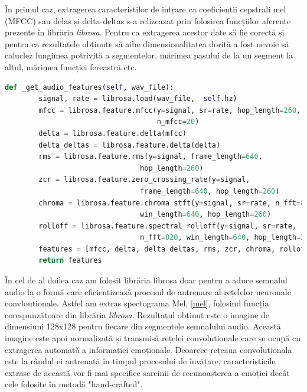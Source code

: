 \documentclass[a4paper,12pt]{book}
\begin{document}
				În primul caz, extragerea caracteristilor de intrare ca coeficientii cepstrali mel (MFCC) sau delas și delta-deltas s-a relizeazat prin folosirea funcțiilor aferente prezente în librăria \textit{librosa}. Pentru ca extragerea acestor date să fie corectă și pentru ca rezultatele obținute să aibe dimensionalitatea dorită a fost nevoie să caluclez lungimea potrivită a segmentelor, mărimea pasului de la un segment la altul, mărimea funcției fereastră etc. \par
				
				\begin{lstlisting}[language=Python, caption={Extragerea caracteristicilor hand-crafted, 3.3, folosind libraria librosa.}, xleftmargin=0cm]
 def _get_audio_features(self, wav_file):
		signal, rate = librosa.load(wav_file,  self.hz)
		mfcc = librosa.feature.mfcc(y=signal, sr=rate, hop_length=260, 
									n_mfcc=20)
		delta = librosa.feature.delta(mfcc)
		delta_deltas = librosa.feature.delta(delta)
		rms = librosa.feature.rms(y=signal, frame_length=640, 
								hop_length=260)
		zcr = librosa.feature.zero_crossing_rate(y=signal, 
								frame_length=640, hop_length=260)
		chroma = librosa.feature.chroma_stft(y=signal, sr=rate, n_fft=820, 
								win_length=640,	hop_length=260)
		rolloff = librosa.feature.spectral_rolloff(y=signal, sr=rate, 
								n_fft=820, win_length=640, hop_length=260)
		features = [mfcc, delta, delta_deltas, rms, zcr, chroma, rolloff]
		return features	\end{lstlisting}
				
				În cel de al doilea caz am folosit librăria librosa doar pentru a aduce semnalul audio la o formă care eficientizează procesul de antrenare al rețelelor neuronale convloutionale. Astfel am extras spectograma Mel, \ref{mel}, folosind funcția corespunzătoare din librăria \textit{librosa}. Rezultatul obținut este o imagine de dimensiuni 128x128 pentru fiecare din segmentele semnalului audio. Această imagine este apoi normalizată și transmisă rețelei convolutionale care se ocupă cu extragerea automată a informației emoționale. Deoarece rețeaua convolutionala este la rândul ei antrenată în timpul procesului de învățare, caracteristicile extrase de această vor fi mai specifice sarcinii de recunoașterea a emoției decât cele folosite în metodă "hand-crafted". \par
				
\end{document}
